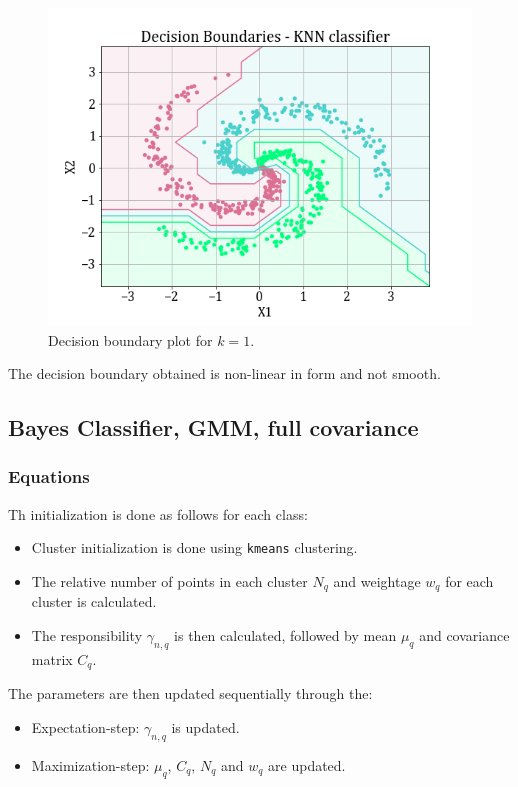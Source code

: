 \documentclass[11pt,a4paper]{article}
\newcommand{\noi}{\noindent}
\def\tt#1{\texttt{#1}}
\begin{document}
\begin{figure}[H]
    \centering
    \includegraphics[scale=0.7]{images/1B/1b_KNN_decision_region.png}
    \caption{Decision boundary plot for $k=1$.}
    \label{fig:1b_decreg_KNN}
\end{figure}

\noi
The decision boundary obtained is non-linear in form and not smooth. 

\break
\subsection{Bayes Classifier, GMM, full covariance}
\subsubsection{Equations}
Th initialization is done as follows for each class:
\begin{itemize}
    \itemsep0em
    \item Cluster initialization is done using \tt{kmeans} clustering.
    \item The relative number of points in each cluster $N_q$ and weightage $w_q$ for each cluster is calculated.
    \item The responsibility $\gamma_{n,q}$ is then calculated, followed by mean $\mu_q$ and covariance matrix $C_q$.
\end{itemize}

\noi
The parameters are then updated sequentially through the:
\begin{itemize}
    \itemsep0em
    \item Expectation-step: $\gamma_{n,q}$ is updated.
    \item Maximization-step: $\mu_q$, $C_q$, $N_q$ and $w_q$ are updated.
\end{itemize}
\end{document}
